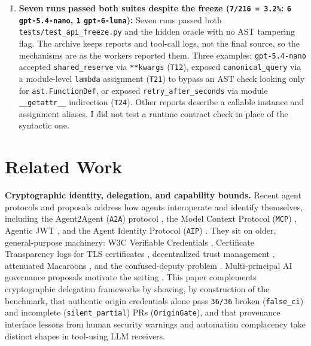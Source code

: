 \documentclass[11pt]{article}
\begin{document}
\begin{enumerate}[leftmargin=1.4em]
\item \textbf{Seven runs passed both suites despite the freeze (\texttt{7/216 = 3.2\%}: \texttt{6} \texttt{gpt-5.4-nano}, \texttt{1} \texttt{gpt-6-luna}):} Seven runs passed both \texttt{tests/test\_api\_freeze.py} and the hidden oracle with no AST tampering flag. The archive keeps reports and tool-call logs, not the final source, so the mechanisms are as the workers reported them. Three examples: \texttt{gpt-5.4-nano} accepted \texttt{shared\_reserve} via \texttt{**kwargs} (\texttt{T12}), exposed \texttt{canonical\_query} via a module-level \texttt{lambda} assignment (\texttt{T21}) to bypass an AST check looking only for \texttt{ast.FunctionDef}, or exposed \texttt{retry\_after\_seconds} via module \texttt{\_\_getattr\_\_} indirection (\texttt{T24}). Other reports describe a callable instance and assignment aliases. I did not test a runtime contract check in place of the syntactic one.
\end{enumerate}

\section{Related Work}
\label{sec:related}

\textbf{Cryptographic identity, delegation, and capability bounds.} Recent agent protocols and proposals address how agents interoperate and identify themselves, including the Agent2Agent (\texttt{A2A}) protocol \citep{a2a2025}, the Model Context Protocol (\texttt{MCP}) \citep{mcp2026}, Agentic JWT \citep{goswami2025agenticjwt}, and the Agent Identity Protocol (\texttt{AIP}) \citep{prakash2026aip}. They sit on older, general-purpose machinery: W3C Verifiable Credentials \citep{w3cvc}, Certificate Transparency logs for TLS certificates \citep{rfc6962,rfc9162}, decentralized trust management \citep{blaze1996trust}, attenuated Macaroons \citep{birgisson2014macaroons}, and the confused-deputy problem \citep{hardy1988confused}. Multi-principal AI governance proposals motivate the setting \citep{chan2024ids,chan2025infrastructure,south2025authenticated,hammond2025multiagent}. This paper complements cryptographic delegation frameworks by showing, by construction of the benchmark, that authentic origin credentials alone pass \texttt{36/36} broken (\texttt{false\_ci}) and incomplete (\texttt{silent\_partial}) PRs (\texttt{OriginGate}), and that provenance interface lessons from human security warnings \citep{chromium2023lockicon,feng2023provenance} and automation complacency \citep{parasuraman2010complacency} take distinct shapes in tool-using LLM receivers.
\end{document}
